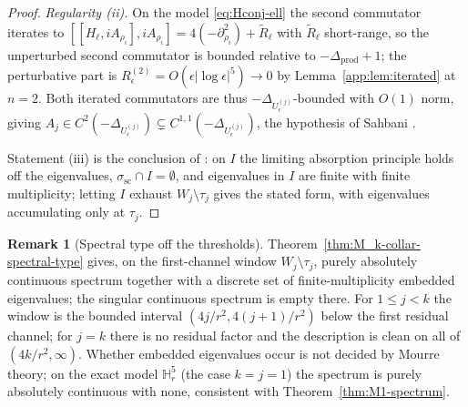 \documentclass[11pt,letterpaper]{article}
\theoremstyle{definition}
\newtheorem{remark}[theorem]{Remark}
\newcommand{\bbH}{\mathbb{H}}
\newcommand{\Lap}{\Delta}
\begin{document}
\begin{proof}
\smallskip
\noindent\emph{Regularity (ii).} On the model \eqref{eq:Hconj-ell} the second commutator iterates to $[[H_\ell,iA_{\rho_i}],iA_{\rho_i}] = 4(-\partial_{\rho_i}^2) + \widetilde R_\ell$ with $\widetilde R_\ell$ short-range, so the unperturbed second commutator is bounded relative to $-\Lap_{\mathrm{prod}}+1$; the perturbative part is $R^{(2)}_\epsilon = O(\epsilon|\log\epsilon|^5)\to 0$ by Lemma~\ref{app:lem:iterated} at $n=2$. Both iterated commutators are thus $-\Lap_{U_\epsilon^{(j)}}$-bounded with $O(1)$ norm, giving $A_j\in C^2(-\Lap_{U_\epsilon^{(j)}})\subsetneq C^{1,1}(-\Lap_{U_\epsilon^{(j)}})$, the hypothesis of Sahbani \cite[Hyp.~H1--H3, p.~411]{Sahbani1997}.

\smallskip
\noindent Statement (iii) is the conclusion of \cite[Thm.~0.1]{Sahbani1997}: on $I$ the limiting absorption principle holds off the eigenvalues, $\sigma_{\mathrm{sc}}\cap I=\emptyset$, and eigenvalues in $I$ are finite with finite multiplicity; letting $I$ exhaust $W_j\setminus\tau_j$ gives the stated form, with eigenvalues accumulating only at $\tau_j$.
\end{proof}

\begin{remark}[Spectral type off the thresholds]\label{rmk:AC}
Theorem~\ref{thm:M_k-collar-spectral-type} gives, on the first-channel window $W_j\setminus\tau_j$, purely absolutely continuous spectrum together with a discrete set of finite-multiplicity embedded eigenvalues; the singular continuous spectrum is empty there. For $1\le j<k$ the window is the bounded interval $(4j/r^2, 4(j+1)/r^2)$ below the first residual channel; for $j=k$ there is no residual factor and the description is clean on all of $(4k/r^2,\infty)$. Whether embedded eigenvalues occur is not decided by Mourre theory; on the exact model $\bbH^5_r$ (the case $k=j=1$) the spectrum is purely absolutely continuous with none, consistent with Theorem~\ref{thm:M1-spectrum}.
\end{remark}
\end{document}
